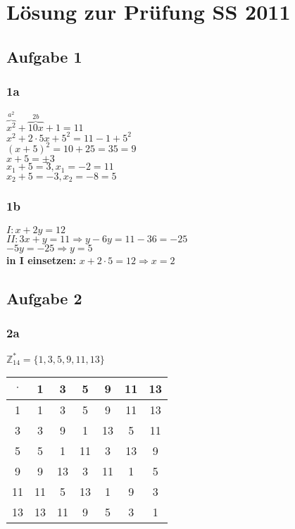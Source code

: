 \renewcommand{\ldate}{2015-06-11}	%

% 

\section{Lösung zur Prüfung SS 2011}

\subsection{Aufgabe 1}

\subsubsection{1a} 
$\overbrace{x^2}^{a^2} + \overbrace{10x}^{2b} + 1 = 11 $ \\
$x^2 + 2 \cdot  5x + 5^2 = 11-1 + 5^2$\\
$(x+5)^2=10+25=35=9$\\
$x+5= \pm 3$\\
$x_1 + 5 = 3, x_1=-2=11$\\
$x_2+5=-3, x_2=-8=5$

\subsubsection{1b}
$I: x+2y=12$\\
$II: 3x+y=11 \Rightarrow y-6y=11-36=-25$\\
$-5y=-25 \Rightarrow y=5$\\
\textbf{in I einsetzen:} $x+2\cdot 5=12 \Rightarrow x=2$

\subsection{Aufgabe 2}

\subsubsection{2a}
$\mathbb{Z}_{14}^* =\{1,3,5,9,11,13\}$ 

\begin{tabular}{|c|c|c|c|c|c|c|}
\hline $\cdot$ & 1 & 3 & 5 & 9 & 11 & 13 \\ 
\hline 1 & 1 & 3 & 5 & 9 & 11 & 13 \\ 
\hline 3 & 3 & 9 & 1 & 13 & 5 & 11 \\ 
\hline 5 & 5 & 1 & 11 & 3 & 13 & 9 \\ 
\hline 9 & 9 & 13 & 3 & 11 & 1 & 5 \\ 
\hline 11 & 11 & 5 & 13 & 1 & 9 & 3 \\ 
\hline 13 & 13 & 11 & 9 & 5 & 3 & 1 \\ 
\hline 
\end{tabular} 

